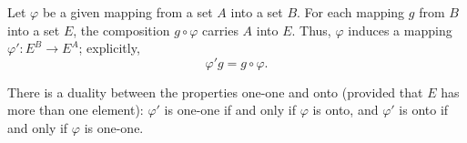 Let $\varphi$ be a given mapping from a set $A$ into a set $B$.
For each mapping $g$ from $B$ into a set $E$,
the composition $g \circ \varphi$ carries $A$ into $E$.
Thus, $\varphi$ induces a mapping $\varphi' : E^B \rightarrow E^A$;
explicitly,
$$\varphi'g = g \circ \varphi.$$

There is a duality between the properties one-one and onto
(provided that $E$ has more than one element):
$\varphi'$ is one-one if and only if $\varphi$ is onto,
and $\varphi'$ is onto if and only if $\varphi$ is one-one.
